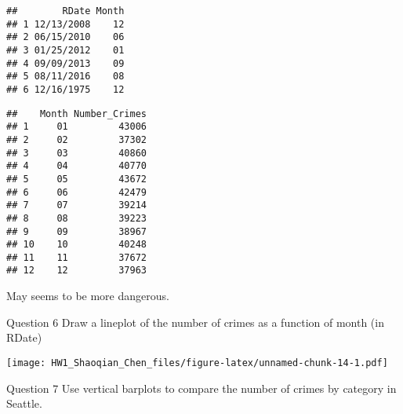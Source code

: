 \documentclass[]{article}
\newenvironment{Shaded}{\begin{snugshade}}{\end{snugshade}}
\newcommand{\DataTypeTok}[1]{\textcolor[rgb]{0.13,0.29,0.53}{#1}}
\newcommand{\KeywordTok}[1]{\textcolor[rgb]{0.13,0.29,0.53}{\textbf{#1}}}
\newcommand{\NormalTok}[1]{#1}
\newcommand{\OperatorTok}[1]{\textcolor[rgb]{0.81,0.36,0.00}{\textbf{#1}}}
\newcommand{\StringTok}[1]{\textcolor[rgb]{0.31,0.60,0.02}{#1}}
\begin{document}
\begin{verbatim}
##        RDate Month
## 1 12/13/2008    12
## 2 06/15/2010    06
## 3 01/25/2012    01
## 4 09/09/2013    09
## 5 08/11/2016    08
## 6 12/16/1975    12
\end{verbatim}

\begin{Shaded}
\end{Shaded}

\begin{verbatim}
##    Month Number_Crimes
## 1     01         43006
## 2     02         37302
## 3     03         40860
## 4     04         40770
## 5     05         43672
## 6     06         42479
## 7     07         39214
## 8     08         39223
## 9     09         38967
## 10    10         40248
## 11    11         37672
## 12    12         37963
\end{verbatim}

May seems to be more dangerous.

Question 6 Draw a lineplot of the number of crimes as a function of
month (in RDate)

\begin{Shaded}
\end{Shaded}

\texttt{[image: HW1\_Shaoqian\_Chen\_files/figure-latex/unnamed-chunk-14-1.pdf]}

Question 7 Use vertical barplots to compare the number of crimes by
category in Seattle.

\begin{Shaded}
\end{Shaded}
\end{document}
